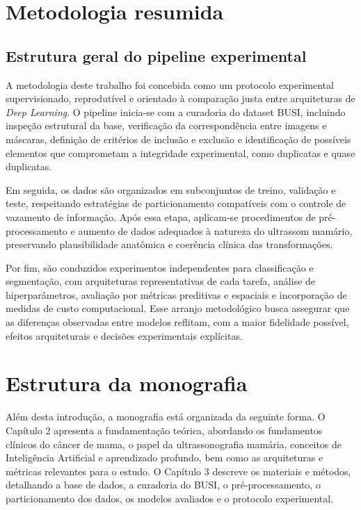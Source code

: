 \documentclass[tcc,capa]{texufpel}
\begin{document}
\section{Metodologia resumida}

\subsection{Estrutura geral do pipeline experimental}

A metodologia deste trabalho foi concebida como um protocolo experimental supervisionado, reprodutível e orientado à comparação justa entre arquiteturas de \textit{Deep Learning}. O pipeline inicia-se com a curadoria do dataset BUSI, incluindo inspeção estrutural da base, verificação da correspondência entre imagens e máscaras, definição de critérios de inclusão e exclusão e identificação de possíveis elementos que comprometam a integridade experimental, como duplicatas e quase duplicatas.

Em seguida, os dados são organizados em subconjuntos de treino, validação e teste, respeitando estratégias de particionamento compatíveis com o controle de vazamento de informação. Após essa etapa, aplicam-se procedimentos de pré-processamento e aumento de dados adequados à natureza do ultrassom mamário, preservando plausibilidade anatômica e coerência clínica das transformações.

Por fim, são conduzidos experimentos independentes para classificação e segmentação, com arquiteturas representativas de cada tarefa, análise de hiperparâmetros, avaliação por métricas preditivas e espaciais e incorporação de medidas de custo computacional. Esse arranjo metodológico busca assegurar que as diferenças observadas entre modelos reflitam, com a maior fidelidade possível, efeitos arquiteturais e decisões experimentais explícitas.

\section{Estrutura da monografia}

Além desta introdução, a monografia está organizada da seguinte forma. O Capítulo 2 apresenta a fundamentação teórica, abordando os fundamentos clínicos do câncer de mama, o papel da ultrassonografia mamária, conceitos de Inteligência Artificial e aprendizado profundo, bem como as arquiteturas e métricas relevantes para o estudo. O Capítulo 3 descreve os materiais e métodos, detalhando a base de dados, a curadoria do BUSI, o pré-processamento, o particionamento dos dados, os modelos avaliados e o protocolo experimental.
\end{document}
